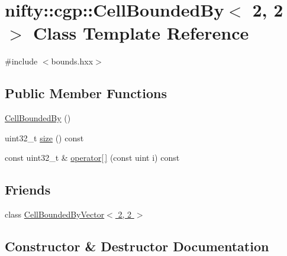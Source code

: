 \hypertarget{classnifty_1_1cgp_1_1CellBoundedBy_3_012_00_012_01_4}{}\section{nifty\+:\+:cgp\+:\+:Cell\+Bounded\+By$<$ 2, 2 $>$ Class Template Reference}
\label{classnifty_1_1cgp_1_1CellBoundedBy_3_012_00_012_01_4}


{\ttfamily \#include $<$bounds.\+hxx$>$}

\subsection*{Public Member Functions}
\begin{DoxyCompactItemize}
\item 
\hyperlink{classnifty_1_1cgp_1_1CellBoundedBy_3_012_00_012_01_4_a1a0bbe867a4d5959bd2dba49c9f61b51}{Cell\+Bounded\+By} ()
\item 
uint32\+\_\+t \hyperlink{classnifty_1_1cgp_1_1CellBoundedBy_3_012_00_012_01_4_ab6e16339e9e0729de75c447d19b04228}{size} () const 
\item 
const uint32\+\_\+t \& \hyperlink{classnifty_1_1cgp_1_1CellBoundedBy_3_012_00_012_01_4_a752a6d337f04c60d416373623dce0c7a}{operator\mbox{[}$\,$\mbox{]}} (const uint i) const 
\end{DoxyCompactItemize}
\subsection*{Friends}
\begin{DoxyCompactItemize}
\item 
class \hyperlink{classnifty_1_1cgp_1_1CellBoundedBy_3_012_00_012_01_4_ac693d488f7701019d117083cebc4508b}{Cell\+Bounded\+By\+Vector$<$ 2, 2 $>$}
\end{DoxyCompactItemize}


\subsection{Constructor \& Destructor Documentation}
\hypertarget{classnifty_1_1cgp_1_1CellBoundedBy_3_012_00_012_01_4_a1a0bbe867a4d5959bd2dba49c9f61b51}{}
